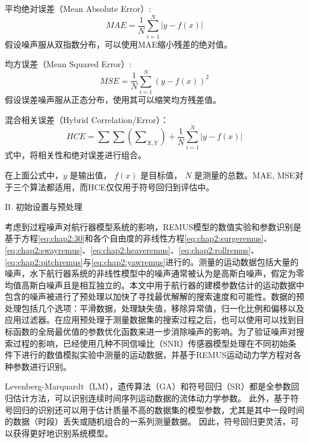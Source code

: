 平均绝对误差（Mean Absolute Error）:
\begin{equation}
MAE = \frac{1}{N}\sum\limits_{i = 1}^N {\left| {y - f\left( x \right)} \right|}
\label{eq:chap3:mae}
\end{equation}
假设噪声服从双指数分布，可以使用MAE缩小残差的绝对值。

均方误差（Mean Squared Error）:
\begin{equation}
MSE = \frac{1}{N}\sum\limits_{i = 1}^N {{{\left( {y - f\left( x \right)} \right)}^2}}
\label{eq:chap3:mse}
\end{equation}
假设误差噪声服从正态分布，使用其可以缩笑均方残差值。

混合相关误差（Hybrid Correlation/Error）：
\begin{equation}
HCE = \sum\limits_{}^{} {\sum\limits_{}^{} {\left( {\sum\nolimits_{X,Y} {} } \right)} }  + \frac{1}{N}\sum\limits_{i = 1}^N {\left| {y - f\left( x \right)} \right|}
\label{eq:chap3:hce}
\end{equation}
式中，将相关性和绝对误差进行组合。

在上面公式中，$y$ 是输出值， $f(x)$ 是目标值， $N$ 是测量的总数。MAE, MSE对于三个算法都适用，而HCE仅仅用于符号回归到评估中。

B. 初始设置与预处理

考虑到过程噪声对航行器模型系统的影响，REMUS模型的数值实验和参数识别是基于方程\ref{eq:chap2:30}和各个自由度的非线性方程\ref{eq:chap2:surgeremus}、\ref{eq:chap2:swayremus}、\ref{eq:chap2:heaveremus}、\ref{eq:chap2:rollremus}、\ref{eq:chap2:pitchremus}与\ref{eq:chap2:yawremus}进行的。测量的运动数据包括大量的噪声，水下航行器系统的非线性模型中的噪声通常被认为是高斯白噪声，假定为零均值高斯白噪声且是相互独立的\cite{sabet2014extended}。本文中用于航行器的建模参数估计的运动数据中包含的噪声被进行了预处理以加快了寻找最优解解的搜索速度和可能性。数据的预处理包括几个选项：平滑数据，处理缺失值，移除异常值，归一化比例和偏移以及应用过滤器。在应用预处理于测量数据集的搜索过程之后，也可以使用可以找到目标函数的全局最优值的参数优化函数来进一步消除噪声的影响。为了验证噪声对搜索过程的影响，已经使用几种不同信噪比（SNR）传感器模型处理在不同初始条件下进行的数值模拟实验中测量的运动数据，并基于REMUS运动动力学方程对各种参数进行识别。

Levenberg-Marquardt（LM），遗传算法（GA）和符号回归（SR）都是全参数回归估计方法，可以识别连续时间序列运动数据的流体动力学参数。 此外，基于符号回归的识别还可以用于估计质量不高的数据集的模型参数，尤其是其中一段时间的数据（时段）丢失或随机组合的一系列测量数据。 因此，符号回归更灵活，可以获得更好地识别系统模型。

